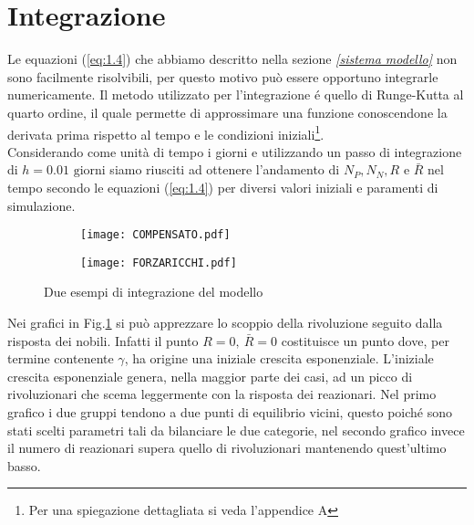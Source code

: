 \section{Integrazione}
Le equazioni (\ref{eq:1.4}) che abbiamo descritto nella sezione \emph{\ref{sistema modello}} non sono facilmente risolvibili, per questo motivo può essere opportuno integrarle numericamente. Il metodo utilizzato per l'integrazione é quello di Runge-Kutta al quarto ordine, il quale permette di approssimare una funzione conoscendone la derivata prima rispetto al tempo e le condizioni iniziali\footnote{Per una spiegazione dettagliata si veda l'appendice A}. \\
Considerando come unità di tempo i giorni e utilizzando un passo di integrazione di $ h=0.01 \text{ giorni}$ siamo riusciti ad ottenere l'andamento di $ N_{P}, N_{N}, R$ e $\bar{R} $ nel tempo secondo le equazioni (\ref{eq:1.4}) per diversi valori iniziali e paramenti di simulazione.
\begin{figure}[H]
	\centering
	\begin{subfigure}[H]{0.49\textwidth}
		\centering
		\texttt{[image: COMPENSATO.pdf]}
	\end{subfigure}
	\hfill
	\begin{subfigure}[H]{0.49\textwidth}
		\centering
		\texttt{[image: FORZARICCHI.pdf]}
	\end{subfigure}
\caption{Due esempi di integrazione del modello}
\label{grafici integrazione}
\end{figure}
Nei grafici in Fig.\ref{grafici integrazione} si può apprezzare lo scoppio della rivoluzione seguito dalla risposta dei nobili. Infatti il punto $R=0,\ \bar{R}=0$ costituisce un punto dove, per termine contenente $\gamma$, ha origine una iniziale crescita esponenziale. L'iniziale crescita esponenziale genera, nella maggior parte dei casi, ad un picco di rivoluzionari che scema leggermente con la risposta dei reazionari. Nel primo grafico i due gruppi tendono a due punti di equilibrio vicini, questo poiché sono stati scelti parametri tali da bilanciare le due categorie, nel secondo grafico invece il numero di reazionari supera quello di rivoluzionari mantenendo quest'ultimo basso.
